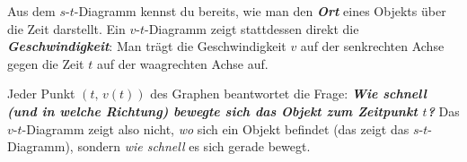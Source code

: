\documentclass[addpoints,11pt,a4paper]{exam}
\begin{document}
\begin{theoriebox}
Aus dem $s$-$t$-Diagramm kennst du bereits, wie man den \textbf{\emph{Ort}}
eines Objekts über die Zeit darstellt. Ein $v$-$t$-Diagramm zeigt
stattdessen direkt die \textbf{\emph{Geschwindigkeit}}: Man trägt die
Geschwindigkeit $v$ auf der senkrechten Achse gegen die Zeit $t$ auf der
waagrechten Achse auf.

Jeder Punkt $(t,\,v(t))$ des Graphen beantwortet die Frage:
\textbf{\emph{Wie schnell (und in welche Richtung) bewegte sich das
Objekt zum Zeitpunkt $t$?}} Das $v$-$t$-Diagramm zeigt also nicht, \emph{wo}
sich ein Objekt befindet (das zeigt das $s$-$t$-Diagramm), sondern
\emph{wie schnell} es sich gerade bewegt.

\begin{center}
\end{center}
\end{theoriebox}
\end{document}
